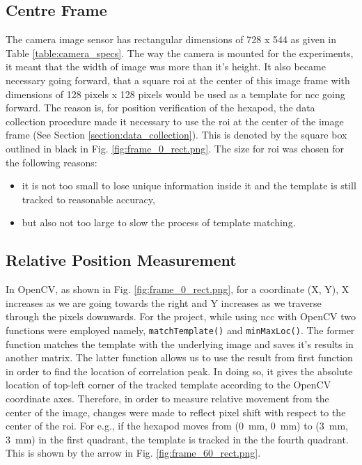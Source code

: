     \subsection*{Centre Frame}
        The camera image sensor has rectangular dimensions of 728 x 544 as given in Table \ref{table:camera_specs}. The way the camera is mounted for the experiments, it meant that the width of image was more than it's height. It also became necessary going forward, that a square \gls{roi} at the center of this image frame with dimensions of 128 pixels x 128 pixels would be used as a template for \gls{ncc} going forward. The reason is, for position verification of the hexapod, the data collection procedure made it necessary to use the \gls{roi} at the center of the image frame (See Section \ref{section:data_collection}). This is denoted by the square box outlined in black in Fig. \ref{fig:frame_0_rect.png}. The size for \gls{roi} was chosen for the following reasons:
        \begin{itemize}
            \item it is not too small to lose unique information inside it and the template is still tracked to reasonable accuracy,
            \item but also not too large to slow the process of template matching.
        \end{itemize}
        
    \subsection*{Relative Position Measurement}
        In OpenCV, as shown in Fig. \ref{fig:frame_0_rect.png}, for a coordinate (X, Y), X increases as we are going towards the right and Y increases as we traverse through the pixels downwards. For the project, while using \gls{ncc} with OpenCV two functions were employed namely, \texttt{matchTemplate()} and \texttt{minMaxLoc()}. The former function matches the template with the underlying image and saves it's results in another matrix. The latter function allows us to use the result from first function in order to find the location of correlation peak. In doing so, it gives the absolute location of top-left corner of the tracked template according to the OpenCV coordinate axes. Therefore, in order to measure relative movement from the center of the image, changes were made to reflect pixel shift with respect to the center of the \gls{roi}. For e.g., if the hexapod moves from (\SI{0}{\milli\meter}, \SI{0}{\milli\meter}) to (\SI{3}{\milli\meter}, \SI{3}{\milli\meter}) in the first quadrant, the template is tracked in the the fourth quadrant. This is shown by the arrow in Fig. \ref{fig:frame_60_rect.png}. 

